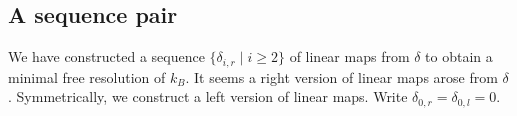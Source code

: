 \documentclass[a4paper,10pt]{amsart}
\theoremstyle{definition}
\numberwithin{equation}{section}
\begin{document}

\subsection{A sequence pair}

We have constructed a sequence $\{\delta_{i,r}\mid i\geq 2\}$ of linear maps from $\delta$ to obtain a minimal free resolution of $k_B$. It seems a right version of linear maps arose from $\delta$. Symmetrically, we construct a left version of linear maps. Write $\delta_{0,r}=\delta_{0,l}=0$.
\end{document}
